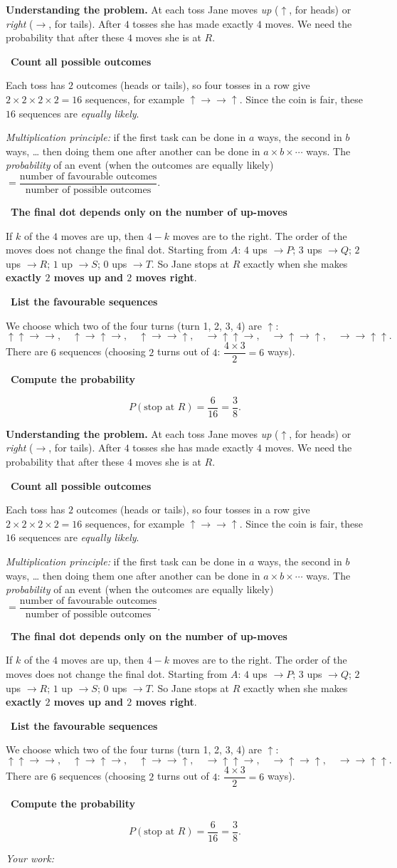 \documentclass[11pt]{article}
\newif\ifsol \soltrue
\newcommand{\StuProb}[2]{\begin{probboxS}{#1}{#2}\StuProbBody\end{probboxS}}
\newcommand{\probsol}[1]{%
  \begin{lrbox}{\solmeasure}\begin{minipage}{\dimexpr\linewidth-24pt\relax}#1\end{minipage}\end{lrbox}%
  \ifsol
    \begin{solbox}#1\end{solbox}%
  \else
    \setlength{\solht}{\dimexpr\ht\solmeasure+\dp\solmeasure+0.85cm\relax}%
    \ifdim\solht<1.35cm\setlength{\solht}{1.35cm}\fi
    \ifdim\solht>\StudentMaxWork\setlength{\solht}{\StudentMaxWork}\fi
    \par\noindent\begin{minipage}{\linewidth}%
    \expandafter\StuProb\StuProbArgs
    \begin{tcolorbox}[colback=white,colframe=Line,boxrule=0.8pt,arc=5pt,
      left=8pt,right=8pt,top=4pt,bottom=4pt,height=\solht]{\footnotesize\color{Slate}\itshape\WorkWord}\end{tcolorbox}%
    \end{minipage}\par\medskip
  \fi}
\newlength{\StudentMaxWork}\setlength{\StudentMaxWork}{4.5cm}
\newcommand{\step}[2]{\par\smallskip\noindent{\bfseries\color{tmBlue!85!black}\StepWord~#1.}\ {\bfseries #2}\par\nopagebreak}
\def\WorkWord{Your work:}
\def\StepWord{Step}
\begin{document}
\probsol{
\textbf{Understanding the problem.} At each toss Jane moves \emph{up} ($\uparrow$, for heads) or \emph{right}
($\rightarrow$, for tails). After $4$ tosses she has made exactly $4$ moves. We need the probability that after these
$4$ moves she is at $R$.

\step{1}{Count all possible outcomes}
Each toss has $2$ outcomes (heads or tails), so four tosses in a row give
$2\times2\times2\times2=16$ sequences, for example $\uparrow\rightarrow\rightarrow\uparrow$.
Since the coin is fair, these $16$ sequences are \emph{equally likely}.
\begin{recallbox}\emph{Multiplication principle:} if the first task can be done in $a$ ways, the second in $b$ ways, \dots{} then
doing them one after another can be done in $a\times b\times\cdots$ ways. The \emph{probability} of an event (when the outcomes
are equally likely) $=\dfrac{\text{number of favourable outcomes}}{\text{number of possible outcomes}}$.\end{recallbox}

\step{2}{The final dot depends only on the number of up-moves}
If $k$ of the $4$ moves are up, then $4-k$ moves are to the right. The order of the moves does not change the final dot.
Starting from $A$: $4$ ups $\to P$; $3$ ups $\to Q$; $2$ ups $\to R$; $1$ up $\to S$; $0$ ups $\to T$.
So Jane stops at $R$ exactly when she makes \textbf{exactly $2$ moves up and $2$ moves right}.

\step{3}{List the favourable sequences}
We choose which two of the four turns (turn 1, 2, 3, 4) are $\uparrow$:
\[\uparrow\uparrow\rightarrow\rightarrow,\quad \uparrow\rightarrow\uparrow\rightarrow,\quad
\uparrow\rightarrow\rightarrow\uparrow,\quad \rightarrow\uparrow\uparrow\rightarrow,\quad
\rightarrow\uparrow\rightarrow\uparrow,\quad \rightarrow\rightarrow\uparrow\uparrow.\]
There are $6$ sequences (choosing $2$ turns out of $4$: $\dfrac{4\times3}{2}=6$ ways).

\step{4}{Compute the probability}
\[P(\text{stop at } R)=\frac{6}{16}=\frac38.\]

}
\end{document}
